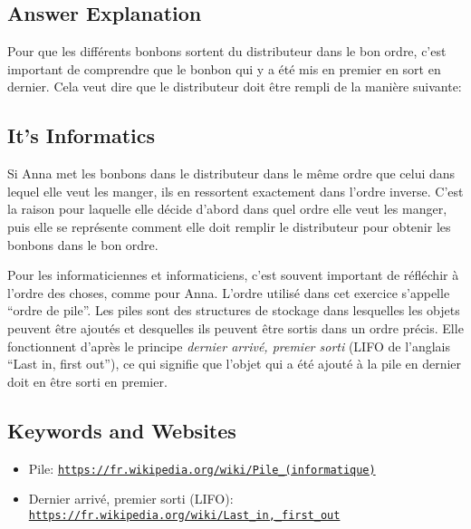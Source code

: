 \documentclass[a4paper,11pt]{report}
\newcommand{\BrochureUrlText}[1]{\texttt{#1}}
\newcommand{\taskGraphicsFolder}{..}
\begin{document}
\endgroup

\subsection*{Answer Explanation}

Pour que les différents bonbons sortent du distributeur dans le bon ordre, c’est important de comprendre que le bonbon qui y a été mis en premier en sort en dernier. Cela veut dire que le distributeur doit être rempli de la manière suivante:

{\centering%
\par}


\subsection*{It’s Informatics}

Si Anna met les bonbons dans le distributeur dans le même ordre que celui dans lequel elle veut les manger, ils en ressortent exactement dans l’ordre inverse. C’est la raison pour laquelle elle décide d’abord dans quel ordre elle veut les manger, puis elle se représente comment elle doit remplir le distributeur pour obtenir les bonbons dans le bon ordre.

Pour les informaticiennes et informaticiens, c’est souvent important de réfléchir à l’ordre des choses, comme pour Anna. L’ordre utilisé dans cet exercice s’appelle “ordre de pile”. Les piles sont des structures de stockage dans lesquelles les objets peuvent être ajoutés et desquelles ils peuvent être sortis dans un ordre précis. Elle fonctionnent d’après le principe \emph{dernier arrivé, premier sorti} (LIFO de l’anglais “Last in, first out”), ce qui signifie que l’objet qui a été ajouté à la pile en dernier doit en être sorti en premier.

{\raggedright

\subsection*{Keywords and Websites}

\begin{itemize}
  \item Pile: \href{https://fr.wikipedia.org/wiki/Pile_(informatique)}{\BrochureUrlText{https://fr.wikipedia.org/wiki/Pile\_(informatique)}}
  \item Dernier arrivé, premier sorti (LIFO): \href{https://fr.wikipedia.org/wiki/Last_in,_first_out}{\BrochureUrlText{https://fr.wikipedia.org/wiki/Last\_in,\_first\_out}}
\end{itemize}


}
\end{document}

